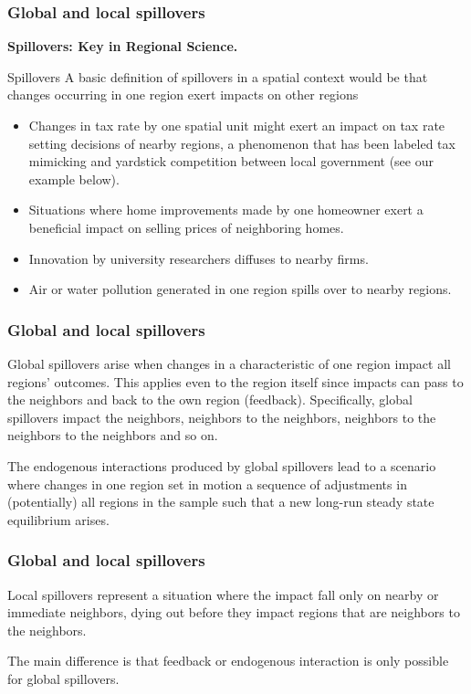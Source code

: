 \documentclass[english,10pt]{beamer}\usepackage[]{graphicx}\usepackage[]{xcolor}
\begin{document}
\begin{frame}
  \frametitle{Global and local spillovers}
  \textbf{\alert{Spillovers:} Key in Regional Science.}
  
  \begin{alertblock}{Spillovers}
   A basic definition of spillovers in a spatial context would be that changes occurring in one region exert impacts on other regions
  \end{alertblock}

\begin{itemize}
  \item Changes in tax rate by one spatial unit might exert an impact on tax rate setting decisions of nearby regions, a phenomenon that has been labeled tax mimicking and yardstick competition between local government (see our example below). 
  \item Situations where home improvements made by one homeowner exert a beneficial impact on selling prices of neighboring homes.
  \item Innovation by university researchers diffuses to nearby firms.
  \item Air or water pollution generated in one region spills over to nearby regions. 
\end{itemize}

\end{frame}


\begin{frame}
  \frametitle{Global and local spillovers}
    \begin{definition}
	 Global spillovers arise when changes in a characteristic of one region impact all regions' outcomes. This applies even to the region itself since impacts can pass to the neighbors and back to the own region (feedback). Specifically, global spillovers impact the neighbors, neighbors to the neighbors, neighbors to the neighbors to the neighbors and so on. 
\end{definition}

The endogenous interactions produced by global spillovers lead to a scenario where changes in one region set in motion a sequence of adjustments in (potentially) all regions in the sample such that a new long-run steady state equilibrium arises.
\end{frame}

\begin{frame}
  \frametitle{Global and local spillovers}
   \begin{definition}
 	Local spillovers represent a situation where the impact fall only on nearby or immediate neighbors, dying out before they impact regions that are neighbors to the neighbors.
 \end{definition}	

The main difference is that feedback or endogenous interaction is only  possible for global spillovers.
\end{frame}
\end{document}
